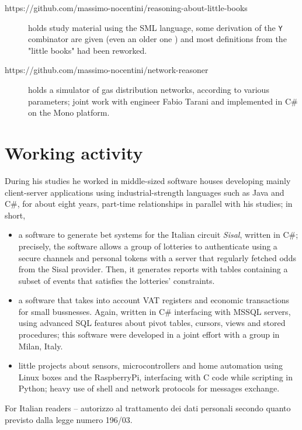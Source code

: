 \documentclass[a4paper]{tufte-handout}
\begin{document}
\begin{description}
        \item[https://github.com/massimo-nocentini/reasoning-about-little-books]
        holds study material using the SML language, some derivation of the \verb|Y|
        combinator are given (even an older one ) and most definitions from
        the "little books" had been reworked.

        \item[https://github.com/massimo-nocentini/network-reasoner] holds a
        simulator of gas distribution networks, according to various
        parameters; joint work with engineer Fabio Tarani and implemented in
        C\# on the Mono platform.
        

        
    \end{description}

    \section{Working activity}

    During his studies he worked in middle-sized software houses
     developing mainly client-server
    applications using industrial-strength languages such as Java and C\#, for
    about eight years, part-time relationships in parallel with his studies; in short,
    \begin{itemize}
        \item a software to generate bet systems for the Italian circuit
        \textit{Sisal}, written in C\#; precisely, the software allows a group
        of lotteries to authenticate using a secure channels and personal
        tokens with a server that regularly fetched odds from the Sisal
        provider. Then, it generates reports with tables containing a
        subset of events that satisfies the lotteries' constraints.
        \item a software that takes into account VAT registers and economic
        transactions for small bussnesses. Again, written in C\# interfacing 
        with MSSQL servers, using advanced SQL features about pivot tables,
        cursors, views and stored procedures; this software were developed in
        a joint effort with a group in Milan, Italy.
        \item little projects about sensors, microcontrollers and home
        automation using Linux boxes and the RaspberryPi, interfacing with C
        code while scripting in Python; heavy use of shell and network protocols
        for messages exchange.
    \end{itemize}
        
    \vfill
    \noindent\makebox[\linewidth]{\rule{\textwidth}{0.4pt}}
    For Italian readers -- autorizzo al trattamento dei dati personali secondo
    quanto previsto dalla legge numero 196/03.
    
\end{document}
